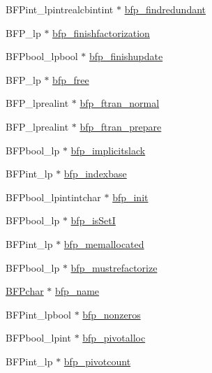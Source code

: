 \begin{DoxyCompactItemize}
\item 
B\+F\+Pint\+\_\+lpintrealcbintint $\ast$ \hyperlink{struct__lprec_a441a52f0de64adf85837ff8381b2a559}{bfp\+\_\+findredundant}
\item 
B\+F\+P\+\_\+lp $\ast$ \hyperlink{struct__lprec_a4d9bb00bc9f1c2c671202761dece8809}{bfp\+\_\+finishfactorization}
\item 
B\+F\+Pbool\+\_\+lpbool $\ast$ \hyperlink{struct__lprec_ace0e15168f2af866c2f37b2798bb5ce8}{bfp\+\_\+finishupdate}
\item 
B\+F\+P\+\_\+lp $\ast$ \hyperlink{struct__lprec_a80bd2b682fa8881dd3f3d6f6eb867cd8}{bfp\+\_\+free}
\item 
B\+F\+P\+\_\+lprealint $\ast$ \hyperlink{struct__lprec_a19d1c22856c87867aed54f8ce6889038}{bfp\+\_\+ftran\+\_\+normal}
\item 
B\+F\+P\+\_\+lprealint $\ast$ \hyperlink{struct__lprec_a701431d50ca884de29bfe2a17af2a74e}{bfp\+\_\+ftran\+\_\+prepare}
\item 
B\+F\+Pbool\+\_\+lp $\ast$ \hyperlink{struct__lprec_ad2264c3bdf1b1d979b9f62127e0395dd}{bfp\+\_\+implicitslack}
\item 
B\+F\+Pint\+\_\+lp $\ast$ \hyperlink{struct__lprec_a152488284171832bd75cbc41e3ad9370}{bfp\+\_\+indexbase}
\item 
B\+F\+Pbool\+\_\+lpintintchar $\ast$ \hyperlink{struct__lprec_ad4a7d5ee9f827216d2bf10541c10e7ed}{bfp\+\_\+init}
\item 
B\+F\+Pbool\+\_\+lp $\ast$ \hyperlink{struct__lprec_a9e5852a153fccda3383c2288e824d609}{bfp\+\_\+is\+SetI}
\item 
B\+F\+Pint\+\_\+lp $\ast$ \hyperlink{struct__lprec_adbc0b416c7968bd2162d05043f7db89d}{bfp\+\_\+memallocated}
\item 
B\+F\+Pbool\+\_\+lp $\ast$ \hyperlink{struct__lprec_a0528f3312074d25252382efaf78e9104}{bfp\+\_\+mustrefactorize}
\item 
\hyperlink{lp__lib_8h_a9dc68af9d2fb34abd17c9e524a76b72d}{B\+F\+Pchar} $\ast$ \hyperlink{struct__lprec_acb8c9e5796b3ee06de7f6970e29c82cb}{bfp\+\_\+name}
\item 
B\+F\+Pint\+\_\+lpbool $\ast$ \hyperlink{struct__lprec_a934d4b2ea2809925a01098aeaaa32192}{bfp\+\_\+nonzeros}
\item 
B\+F\+Pbool\+\_\+lpint $\ast$ \hyperlink{struct__lprec_ab4c9db32460462255fc0adab12a2571b}{bfp\+\_\+pivotalloc}
\item 
B\+F\+Pint\+\_\+lp $\ast$ \hyperlink{struct__lprec_a4292ffe1b7e1ade04dedf97e094e2f25}{bfp\+\_\+pivotcount}
\item 

\end{DoxyCompactItemize}
